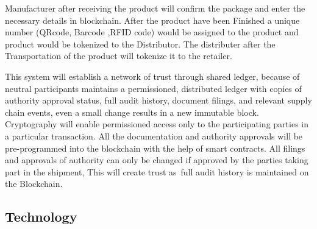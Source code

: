 \documentclass[12pt]{article}
\begin{document}
\begin{justify}
{\fontsize{14pt}{16.8pt}\selectfont Manufacturer after receiving the product will confirm the package and enter the necessary details in blockchain. After the product have been Finished a unique number (QRcode, Barcode ,RFID code) would be assigned to the product and product would be tokenized to the Distributor. The distributer after the Transportation of the product will tokenize it to the retailer.\par}
\end{justify}\par

\begin{justify}
{\fontsize{14pt}{16.8pt}\selectfont This system will establish a network of trust through shared ledger, because of neutral participants maintains a permissioned, distributed ledger with copies of authority approval status, full audit history, document filings, and relevant supply chain events, even a small change results in a new immutable block. Cryptography will enable permissioned access only to the participating parties in a particular transaction. All the documentation and authority approvals will be pre-programmed into the blockchain with the help of smart contracts. All filings and approvals of authority can only be changed if approved by the parties taking part in the shipment, This will create trust as\  full audit history is maintained on the Blockchain.\par}
\end{justify}\par


\vspace{\baselineskip}



\newpage

\vspace{\baselineskip}\begin{Center}
\section*{Technology}
\end{Center}


\end{document}

